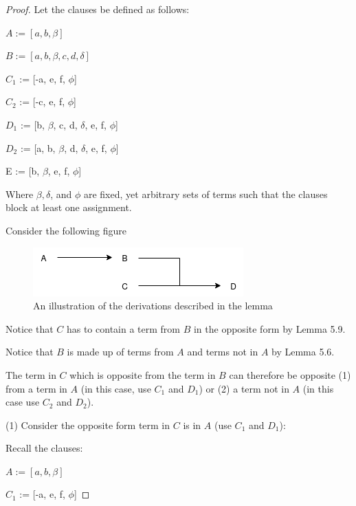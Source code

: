 \documentclass[manuscript]{acmart}
\begin{document}
    \begin{proof}

        Let the clauses be defined as follows:

        $A := [a, b, \beta]$
        
        $B := [a, b, \beta, c, d, \delta]$

        $C_1$ := [-a, e, f, $\phi$]

        $C_2$ := [-c, e, f, $\phi$]

        $D_1$ := [b, $\beta$, c, d, $\delta$, e, f, $\phi$]

        $D_2$ := [a, b, $\beta$, d, $\delta$, e, f, $\phi$]

        E := [b, $\beta$, e, f, $\phi$]

        Where $\beta, \delta$, and $\phi$ are fixed, yet arbitrary sets of terms such that the clauses block at least one assignment.

        Consider the following figure

        \begin{figure}[h]
            \includegraphics[scale=0.8]{318}
            \caption{An illustration of the derivations described in the lemma}
        \end{figure}

        Notice that $C$ has to contain a term from $B$ in the opposite form by Lemma 5.9.

        Notice that $B$ is made up of terms from $A$ and terms not in $A$
        by Lemma 5.6.

        The term in $C$ which is opposite from the term in $B$ can therefore
        be opposite (1) from a term in $A$ (in this case, use $C_1$ and $D_1$) or (2) a term not in $A$ (in this case use $C_2$ and $D_2$).
        
        (1) Consider the opposite form term in $C$ is in $A$ (use $C_1$ and $D_1$):

        Recall the clauses:

        $A := [a, b, \beta]$
        
        $C_1$ := [-a, e, f, $\phi$]


\end{proof}
\end{document}
